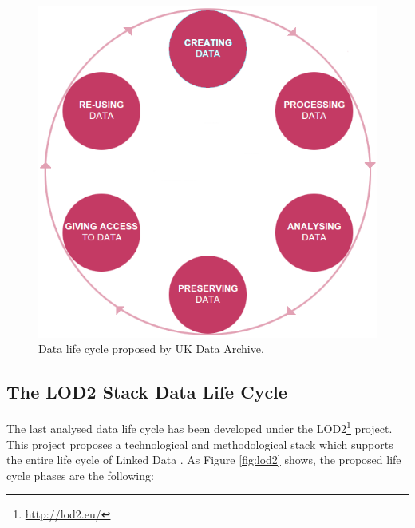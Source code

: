 \begin{figure}
    \center
    \includegraphics[scale=0.3]{img/data_lifecycle/uk-data-archive.png}
    \caption{Data life cycle proposed by UK Data Archive.}
    \label{fig:uk-data-archive}
\end{figure}

\subsection{The LOD2 Stack Data Life Cycle}

The last analysed data life cycle  has been developed under the LOD2\footnote{\url{http://lod2.eu/}} project. This project proposes a technological and methodological stack which supports the entire life cycle of Linked Data \cite{auer_managing_2012}.  As Figure \ref{fig:lod2} shows, the proposed life cycle phases are the following:

